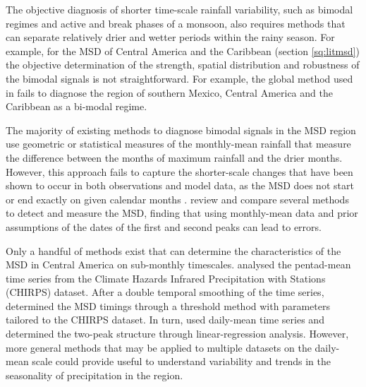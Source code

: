 
The objective diagnosis of shorter time-scale rainfall variability, such as bimodal regimes and active and break phases of a monsoon, also requires methods that can separate relatively drier and wetter periods within the rainy season. For example, for the MSD of Central America and the Caribbean (section \ref{sq:litmsd}) the objective determination of the strength, spatial distribution and robustness of the bimodal signals is not straightforward. For example, the global method used in \cite{bombardi2019} fails to diagnose the region of southern Mexico, Central America and the Caribbean as a bi-modal regime. 

The majority of existing methods to diagnose bimodal signals in the MSD region use geometric or statistical measures of the monthly-mean rainfall that measure the difference between the months of maximum rainfall and the drier months.  
However, this approach fails to capture the shorter-scale changes that have been shown to occur in both observations and model data, as the MSD does not start or end exactly on given calendar months \citep{magana1999,garciafranco2020}.  \cite{zhao2021} review and compare several methods to detect and measure the MSD, finding that using monthly-mean data and prior assumptions of the dates of the first and second peaks can lead to errors.  %

Only a handful of methods exist that can determine the characteristics of the MSD in Central America on sub-monthly timescales. \cite{anderson2019multiscale} analysed the pentad-mean time series from the   Climate Hazards Infrared Precipitation with Stations (CHIRPS) dataset. After a double temporal smoothing of the time series, \cite{anderson2019multiscale} determined the MSD timings through a threshold method with parameters tailored to the CHIRPS dataset.
In turn, \cite{zhao2020} used daily-mean time series and determined the two-peak structure through linear-regression analysis.
However, more general methods that may be applied to multiple datasets on the daily-mean scale could provide useful to understand variability and trends in the seasonality of precipitation in the region.


